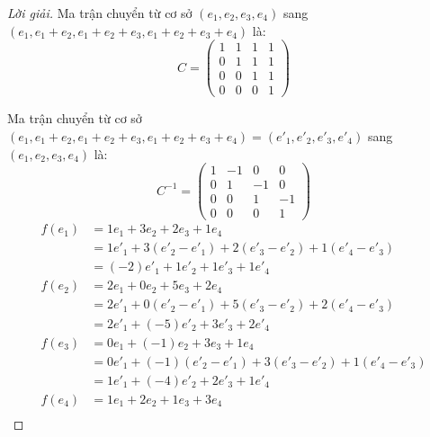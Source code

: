 \begin{proof}[Lời giải]
    Ma trận chuyển từ cơ sở $(e_{1}, e_{2}, e_{3}, e_{4})$ sang $(e_{1}, e_{1} + e_{2}, e_{1} + e_{2} + e_{3}, e_{1} + e_{2} + e_{3} + e_{4})$ là:
    \[
        C =
        \begin{pmatrix}
            1 & 1 & 1 & 1 \\
            0 & 1 & 1 & 1 \\
            0 & 0 & 1 & 1 \\
            0 & 0 & 0 & 1
        \end{pmatrix}
    \]
    \par Ma trận chuyển từ cơ sở $(e_{1}, e_{1} + e_{2}, e_{1} + e_{2} + e_{3}, e_{1} + e_{2} + e_{3} + e_{4}) = (e'_{1}, e'_{2}, e'_{3}, e'_{4})$ sang $(e_{1}, e_{2}, e_{3}, e_{4})$ là:
    \[
        C^{-1} =
        \begin{pmatrix}
            1 & -1 & 0  & 0  \\
            0 & 1  & -1 & 0  \\
            0 & 0  & 1  & -1 \\
            0 & 0  & 0  & 1
        \end{pmatrix}
    \]
    \begin{align*}
        f(e_{1}) & = 1e_{1} + 3e_{2} + 2e_{3} + 1e_{4}                                         \\
                 & = 1e'_{1} + 3(e'_{2} - e'_{1}) + 2(e'_{3} - e'_{2}) + 1(e'_{4} - e'_{3})    \\
                 & = (-2)e'_{1} + 1e'_{2} + 1e'_{3} + 1e'_{4}                                  \\
        f(e_{2}) & = 2e_{1} + 0e_{2} + 5e_{3} + 2e_{4}                                         \\
                 & = 2e'_{1} + 0(e'_{2} - e'_{1}) + 5(e'_{3} - e'_{2}) + 2(e'_{4} - e'_{3})    \\
                 & = 2e'_{1} + (-5)e'_{2} + 3e'_{3} + 2e'_{4}                                  \\
        f(e_{3}) & = 0e_{1} + (-1)e_{2} + 3e_{3} + 1e_{4}                                      \\
                 & = 0e'_{1} + (-1)(e'_{2} - e'_{1}) + 3(e'_{3} - e'_{2}) + 1(e'_{4} - e'_{3}) \\
                 & = 1e'_{1} + (-4)e'_{2} + 2e'_{3} + 1e'_{4}                                  \\
        f(e_{4}) & = 1e_{1} + 2e_{2} + 1e_{3} + 3e_{4}                                         \\

\end{align*}
\end{proof}
